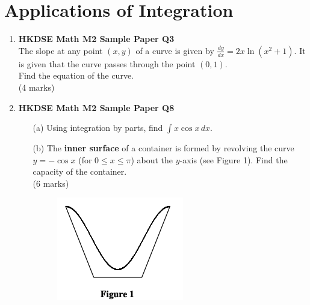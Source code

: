 \documentclass{report}
\begin{document}
\chapter{Applications of Integration}
\begin{enumerate}
	\item \textbf{HKDSE Math M2 Sample Paper Q3}\\
	The slope at any point $(x,y)$ of a curve is given by $\displaystyle\frac{dy}{dx} = 2x \ln{(x^2+1)}$. It is given that the curve passes through the point $(0,1)$.\\Find the equation of the curve. \\(4 marks)

	\item \textbf{HKDSE Math M2 Sample Paper Q8}
	\begin{enumerate}
		\item [(a)]Using integration by parts, find $\displaystyle\int x\cos{x}\,dx$. 
		\item [(b)]The \textbf{inner surface} of a container is formed by revolving the curve $y = -\cos{x}$ (for $0 \leq x \leq \pi$) about the $y$-axis (see Figure 1). Find the capacity of the container. \\(6 marks)
		\begin{figure}[H]
			\centering
			\includegraphics[width = .3\linewidth]{SPFigure1}
		\end{figure}
	\end{enumerate}
	

\end{enumerate}
\end{document}
